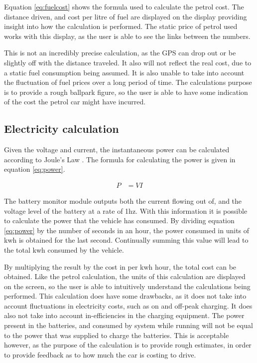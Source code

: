 Equation \ref{eq:fuelcost} shows the formula used to calculate the petrol cost. The distance driven, and cost per litre of fuel are displayed on the display providing insight into how the calculation is performed. The static price of petrol used works with this display, as the user is able to see the links between the numbers.

This is not an incredibly precise calculation, as the GPS can drop out or be slightly off with the distance traveled. It also will not reflect the real cost, due to a static fuel consumption being assumed. It is also unable to take into account the fluctuation of fuel prices over a long period of time. The calculations purpose is to provide a rough ballpark figure, so the user is able to have some indication of the cost the petrol car might have incurred.

\subsection{Electricity calculation}

Given the voltage and current, the instantaneous power can be calculated according to Joule's Law \cite{joules_law}. The formula for calculating the power is given in equation \ref{eq:power}.

\begin{align}
\label{eq:power}
P &= VI
\end{align}

The battery monitor module outputs both the current flowing out of, and the voltage level of the battery at a rate of 1hz. With this information it is possible to calculate the power that the vehicle has consumed. By dividing equation \ref{eq:power} by the number of seconds in an hour, the power consumed in units of kwh is obtained for the last second. Continually summing this value will lead to the total kwh consumed by the vehicle.

By multiplying the result by the cost in per kwh hour, the total cost can be obtained. Like the petrol calculation, the units of this calculation are displayed on the screen, so the user is able to intuitively understand the calculations being performed. This calculation does have some drawbacks, as it does not take into account fluctuations in electricity costs, such as on and off-peak charging. It does also not take into account in-efficiencies in the charging equipment. The power present in the batteries, and consumed by system while running will not be equal to the power that was supplied to charge the batteries. This is acceptable however, as the purpose of the calculation is to provide rough estimates, in order to provide feedback as to how much the car is costing to drive.

